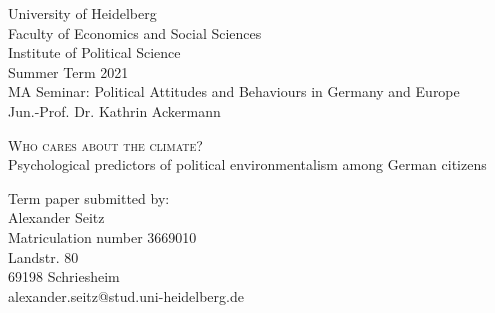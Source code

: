 \thispagestyle{empty}
\setcounter{page}{-1}
\noindent
University of Heidelberg\\
Faculty of Economics and Social Sciences\\
Institute of Political Science\\
Summer Term 2021\\
MA Seminar: Political Attitudes and Behaviours in Germany and Europe\\
Jun.-Prof. Dr. Kathrin Ackermann\\
\begin{center}
\vspace*{6cm}
\huge\textsc{Who cares about the climate?}\\
\LARGE{Psychological predictors of political environmentalism among German citizens}\\
\vspace*{6cm}
\end{center}
Term paper submitted by:\\
Alexander Seitz\\
Matriculation number 3669010\\
Landstr. 80\\
69198 Schriesheim\\
alexander.seitz@stud.uni-heidelberg.de\\
\newpage

